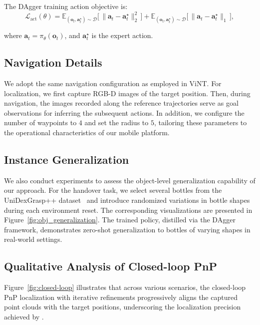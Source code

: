 The DAgger training action objective is:
\begin{equation}
  \mathcal{L}_{\mathrm{act}}(\theta)
  = \mathbb{E}_{(\mathbf{o}_t,\mathbf{a}^{\star}_t)\sim\mathcal{D}}
    \Big[\,\|\mathbf{a}_t-\mathbf{a}^{\star}_t\|_2^{2}\,\Big]
  + \mathbb{E}_{(\mathbf{o}_t,\mathbf{a}^{\star}_t)\sim\mathcal{D}}
    \Big[\,\|\mathbf{a}_t-\mathbf{a}^{\star}_t\|_1\,\Big],
  \label{eq:act_loss_expect}
\end{equation}

where $\mathbf{a}_t=\pi_{\theta}(\mathbf{o}_t)$, and $\mathbf{a}^{\star}_t$ is the expert action.  

\subsection{Navigation Details}
\label{sec:nav}
We adopt the same navigation configuration as employed in ViNT. For localization, we first capture RGB-D images of the target position. Then, during navigation, the images recorded along the reference trajectories serve as goal observations for inferring the subsequent actions. In addition, we configure the number of waypoints to $4$ and set the radius to $5$, tailoring these parameters to the operational characteristics of our mobile platform.

\subsection{Instance Generalization}

We also conduct experiments to assess the object-level generalization capability of our approach. For the handover task, we select several bottles from the UniDexGrasp++ dataset~\cite{wan2023unidexgrasp++} and introduce randomized variations in bottle shapes during each environment reset. The corresponding visualizations are presented in Figure~\ref{fig:obj_generalization}. The trained policy, distilled via the DAgger framework, demonstrates zero-shot generalization to bottles of varying shapes in real-world settings.







\subsection{Qualitative Analysis of Closed-loop PnP}

Figure~\ref{fig:closed-loop} illustrates that across various scenarios, the closed-loop PnP localization with iterative refinements progressively aligns the captured point clouds with the target positions, underscoring the localization precision achieved by \ourshort.


